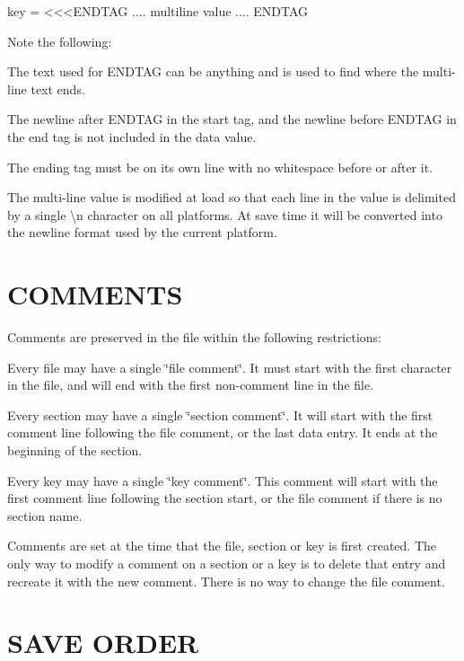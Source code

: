 \begin{DoxyPre}
    key = <<<ENDTAG
    .... multiline value ....
    ENDTAG
    \end{DoxyPre}


Note the following\+:
\begin{DoxyItemize}
\item The text used for E\+N\+D\+T\+AG can be anything and is used to find where the multi-\/line text ends.
\item The newline after E\+N\+D\+T\+AG in the start tag, and the newline before E\+N\+D\+T\+AG in the end tag is not included in the data value.
\item The ending tag must be on it\textquotesingle{}s own line with no whitespace before or after it.
\item The multi-\/line value is modified at load so that each line in the value is delimited by a single \textquotesingle{}\textbackslash{}n\textquotesingle{} character on all platforms. At save time it will be converted into the newline format used by the current platform.
\end{DoxyItemize}\hypertarget{index_comments}{}\section{C\+O\+M\+M\+E\+N\+TS}\label{index_comments}
Comments are preserved in the file within the following restrictions\+:
\begin{DoxyItemize}
\item Every file may have a single \char`\"{}file comment\char`\"{}. It must start with the first character in the file, and will end with the first non-\/comment line in the file.
\item Every section may have a single \char`\"{}section comment\char`\"{}. It will start with the first comment line following the file comment, or the last data entry. It ends at the beginning of the section.
\item Every key may have a single \char`\"{}key comment\char`\"{}. This comment will start with the first comment line following the section start, or the file comment if there is no section name.
\item Comments are set at the time that the file, section or key is first created. The only way to modify a comment on a section or a key is to delete that entry and recreate it with the new comment. There is no way to change the file comment.
\end{DoxyItemize}\hypertarget{index_save}{}\section{S\+A\+V\+E O\+R\+D\+ER}\label{index_save}
